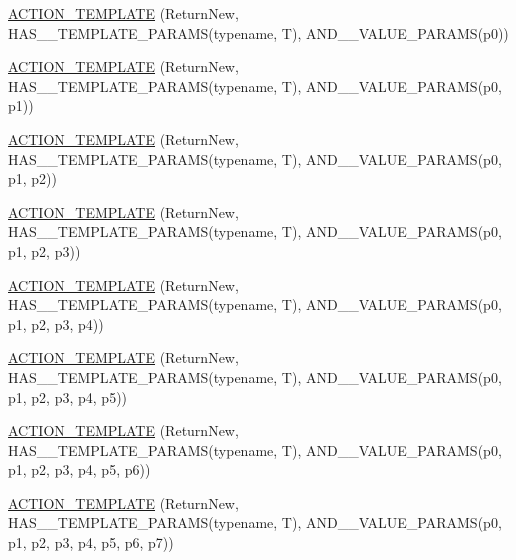 \begin{DoxyCompactItemize}
\item 
\mbox{\hyperlink{namespacetesting_af07e911d69b8efb03bddbd0332f79ba0}{A\+C\+T\+I\+O\+N\+\_\+\+T\+E\+M\+P\+L\+A\+TE}} (Return\+New, H\+A\+S\+\_\+\_\+\+T\+E\+M\+P\+L\+A\+T\+E\+\_\+\+P\+A\+R\+A\+MS(typename, T), A\+N\+D\+\_\+\_\+\+V\+A\+L\+U\+E\+\_\+\+P\+A\+R\+A\+MS(p0))
\item 
\mbox{\hyperlink{namespacetesting_ad418620ed637e789f91d029f4fe85b4b}{A\+C\+T\+I\+O\+N\+\_\+\+T\+E\+M\+P\+L\+A\+TE}} (Return\+New, H\+A\+S\+\_\+\_\+\+T\+E\+M\+P\+L\+A\+T\+E\+\_\+\+P\+A\+R\+A\+MS(typename, T), A\+N\+D\+\_\+\_\+\+V\+A\+L\+U\+E\+\_\+\+P\+A\+R\+A\+MS(p0, p1))
\item 
\mbox{\hyperlink{namespacetesting_ac24511eb64ebe2c2927feaf285ac3785}{A\+C\+T\+I\+O\+N\+\_\+\+T\+E\+M\+P\+L\+A\+TE}} (Return\+New, H\+A\+S\+\_\+\_\+\+T\+E\+M\+P\+L\+A\+T\+E\+\_\+\+P\+A\+R\+A\+MS(typename, T), A\+N\+D\+\_\+\_\+\+V\+A\+L\+U\+E\+\_\+\+P\+A\+R\+A\+MS(p0, p1, p2))
\item 
\mbox{\hyperlink{namespacetesting_afc5a3710d11bdee2023d8402b84d86ed}{A\+C\+T\+I\+O\+N\+\_\+\+T\+E\+M\+P\+L\+A\+TE}} (Return\+New, H\+A\+S\+\_\+\_\+\+T\+E\+M\+P\+L\+A\+T\+E\+\_\+\+P\+A\+R\+A\+MS(typename, T), A\+N\+D\+\_\+\_\+\+V\+A\+L\+U\+E\+\_\+\+P\+A\+R\+A\+MS(p0, p1, p2, p3))
\item 
\mbox{\hyperlink{namespacetesting_a0c03444379adfb849db243829946c1ed}{A\+C\+T\+I\+O\+N\+\_\+\+T\+E\+M\+P\+L\+A\+TE}} (Return\+New, H\+A\+S\+\_\+\_\+\+T\+E\+M\+P\+L\+A\+T\+E\+\_\+\+P\+A\+R\+A\+MS(typename, T), A\+N\+D\+\_\+\_\+\+V\+A\+L\+U\+E\+\_\+\+P\+A\+R\+A\+MS(p0, p1, p2, p3, p4))
\item 
\mbox{\hyperlink{namespacetesting_a2ef1b31693ee2be0bb93602b375fb9ce}{A\+C\+T\+I\+O\+N\+\_\+\+T\+E\+M\+P\+L\+A\+TE}} (Return\+New, H\+A\+S\+\_\+\_\+\+T\+E\+M\+P\+L\+A\+T\+E\+\_\+\+P\+A\+R\+A\+MS(typename, T), A\+N\+D\+\_\+\_\+\+V\+A\+L\+U\+E\+\_\+\+P\+A\+R\+A\+MS(p0, p1, p2, p3, p4, p5))
\item 
\mbox{\hyperlink{namespacetesting_a7b4cfa09367e9938561eeca5a105d183}{A\+C\+T\+I\+O\+N\+\_\+\+T\+E\+M\+P\+L\+A\+TE}} (Return\+New, H\+A\+S\+\_\+\_\+\+T\+E\+M\+P\+L\+A\+T\+E\+\_\+\+P\+A\+R\+A\+MS(typename, T), A\+N\+D\+\_\+\_\+\+V\+A\+L\+U\+E\+\_\+\+P\+A\+R\+A\+MS(p0, p1, p2, p3, p4, p5, p6))
\item 
\mbox{\hyperlink{namespacetesting_a76d58331453ee0a2eb75a5992e35197b}{A\+C\+T\+I\+O\+N\+\_\+\+T\+E\+M\+P\+L\+A\+TE}} (Return\+New, H\+A\+S\+\_\+\_\+\+T\+E\+M\+P\+L\+A\+T\+E\+\_\+\+P\+A\+R\+A\+MS(typename, T), A\+N\+D\+\_\+\_\+\+V\+A\+L\+U\+E\+\_\+\+P\+A\+R\+A\+MS(p0, p1, p2, p3, p4, p5, p6, p7))

\end{DoxyCompactItemize}
